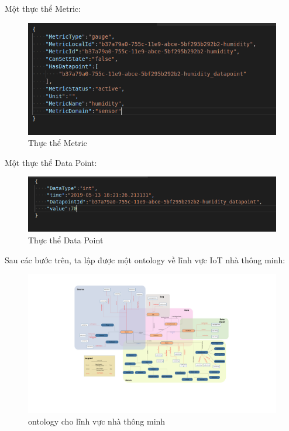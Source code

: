 \hspace{0mm}Một thực thể Metric:
\clearpage
\begin{figure}[h!]
	\center
	\includegraphics[scale=0.6]{image/metric_instance}
	\caption{Thực thể Metric}
\end{figure}

\hspace{0mm}Một thực thể Data Point:
\begin{figure}[h!]
	\center
	\includegraphics[scale=0.6]{image/datapoint_instance}
	\caption{Thực thể Data Point}
\end{figure}

Sau các bước trên, ta lập được một ontology về lĩnh vực IoT nhà thông minh:
\clearpage
\begin{figure}[h!]
	\center
	\includegraphics[scale=0.2, center]{image/ontology-2}
	\caption{ontology cho lĩnh vực nhà thông minh}
\end{figure}


